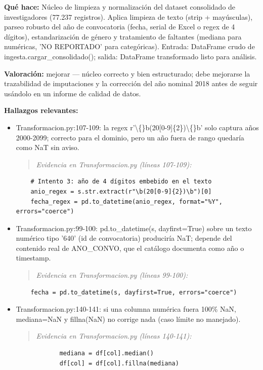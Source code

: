 \textbf{Qué hace:} Núcleo de limpieza y normalización del dataset consolidado de investigadores (77.237 registros). Aplica limpieza de texto (strip + mayúsculas), parseo robusto del año de convocatoria (fecha, serial de Excel o regex de 4 dígitos), estandarización de género y tratamiento de faltantes (mediana para numéricas, 'NO REPORTADO' para categóricas). Entrada: DataFrame crudo de ingesta.cargar\_consolidado(); salida: DataFrame transformado listo para análisis.

\textbf{Valoración:} mejorar --- núcleo correcto y bien estructurado; debe mejorarse la trazabilidad de imputaciones y la corrección del año nominal 2018 antes de seguir usándolo en un informe de calidad de datos.

\textbf{Hallazgos relevantes:}
\begin{itemize}
  \item Transformacion.py:107-109: la regex r'\textbackslash\{\}b(20[0-9]\{2\})\textbackslash\{\}b' solo captura años 2000-2099; correcto para el dominio, pero un año fuera de rango quedaría como NaT sin aviso.
\begin{quote}\footnotesize\ttfamily
\noindent\emph{Evidencia en Transformacion.py (líneas 107-109):}
\end{quote}
\begin{lstlisting}
    # Intento 3: año de 4 dígitos embebido en el texto
    anio_regex = s.str.extract(r"\b(20[0-9]{2})\b")[0]
    fecha_regex = pd.to_datetime(anio_regex, format="%Y", errors="coerce")
\end{lstlisting}

  \item Transformacion.py:99-100: pd.to\_datetime(s, dayfirst=True) sobre un texto numérico tipo '640' (id de convocatoria) produciría NaT; depende del contenido real de ANO\_CONVO, que el catálogo documenta como año o timestamp.
\begin{quote}\footnotesize\ttfamily
\noindent\emph{Evidencia en Transformacion.py (líneas 99-100):}
\end{quote}
\begin{lstlisting}
    fecha = pd.to_datetime(s, dayfirst=True, errors="coerce")

\end{lstlisting}

  \item Transformacion.py:140-141: si una columna numérica fuera 100\% NaN, mediana=NaN y fillna(NaN) no corrige nada (caso límite no manejado).
\begin{quote}\footnotesize\ttfamily
\noindent\emph{Evidencia en Transformacion.py (líneas 140-141):}
\end{quote}
\begin{lstlisting}
            mediana = df[col].median()
            df[col] = df[col].fillna(mediana)
\end{lstlisting}

\end{itemize}

